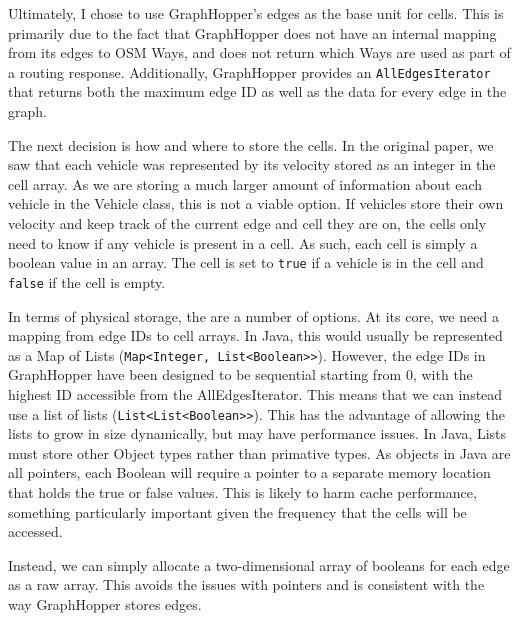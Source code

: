 \documentclass[ %
                    author={Alexander Hill},
                supervisor={Dr. Benjamin Sach},
                    degree={MEng},
                     title={MARMOSET},
                  subtitle={Multi-Agent Route Management using Online Simulation for Efficient Transportation},
                      type={research},
                      year={2016} ]{dissertation}
\begin{document}
Ultimately, I chose to use GraphHopper's edges as the base unit for cells. This
is primarily due to the fact that GraphHopper does not have an internal mapping
from its edges to OSM Ways, and does not return which Ways are used as part of a
routing response. Additionally, GraphHopper provides an
\texttt{AllEdgesIterator} that returns both the maximum edge ID as well as the
data for every edge in the graph.

The next decision is how and where to store the cells. In the original paper, we
saw that each vehicle was represented by its velocity stored as an integer in
the cell array. As we are storing a much larger amount of information about each
vehicle in the Vehicle class, this is not a viable option. If vehicles store
their own velocity and keep track of the current edge and cell they are on, the
cells only need to know if any vehicle is present in a cell. As such, each cell
is simply a boolean value in an array. The cell is set to \texttt{true} if a
vehicle is in the cell and \texttt{false} if the cell is empty.

In terms of physical storage, the are a number of options. At its core, we need
a mapping from edge IDs to cell arrays. In Java, this would usually be
represented as a Map of Lists (\texttt{Map<Integer, List<Boolean>>}). However,
the edge IDs in GraphHopper have been designed to be sequential starting from 0,
with the highest ID accessible from the AllEdgesIterator. This means that we can
instead use a list of lists (\texttt{List<List<Boolean>>}). This has the
advantage of allowing the lists to grow in size dynamically, but may have
performance issues. In Java, Lists must store other Object types rather than
primative types. As objects in Java are all pointers, each Boolean will require
a pointer to a separate memory location that holds the true or false values.
This is likely to harm cache performance, something particularly important given
the frequency that the cells will be accessed.

Instead, we can simply allocate a two-dimensional array of booleans for each
edge as a raw array. This avoids the issues with pointers and is consistent with
the way GraphHopper stores edges.
\end{document}

